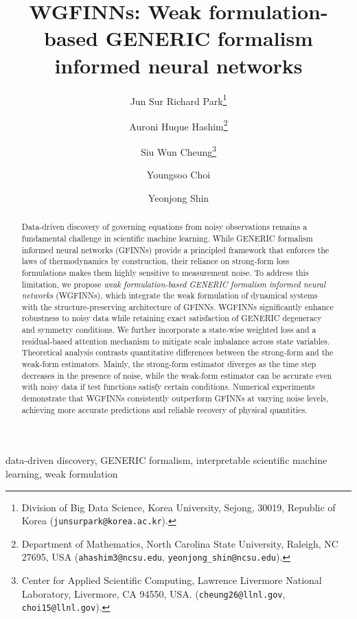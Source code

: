 \documentclass[final]{siamltex}
\title{WGFINN{s}: Weak formulation-based GENERIC formalism informed neural networks}
\author{
Jun Sur Richard Park\thanks{Division of Big Data Science, Korea University, Sejong, 30019, Republic of Korea (\texttt{junsurpark@korea.ac.kr}).}
\and
Auroni Huque Hashim\thanks{Department of Mathematics, North Carolina State University, Raleigh, NC 27695, USA (\texttt{ahashim3@ncsu.edu}, \texttt{yeonjong\_shin@ncsu.edu}).}
\and
Siu Wun Cheung\thanks{Center for Applied Scientific Computing, Lawrence Livermore National Laboratory, Livermore, CA 94550, USA. (\texttt{cheung26@llnl.gov},
\texttt{choi15@llnl.gov}).}
\and
Youngsoo Choi\footnotemark[3]%
\and
Yeonjong Shin\footnotemark[2]
}
\begin{document}
\maketitle 

\begin{abstract}
Data-driven discovery of governing equations from noisy observations remains a fundamental challenge in scientific machine learning. 
While GENERIC formalism informed neural networks (GFINNs) provide a principled framework that enforces the laws of thermodynamics by construction, their reliance on strong-form loss formulations makes them highly sensitive to measurement noise.
To address this limitation, we propose \emph{weak formulation-based GENERIC formalism informed neural networks} (WGFINNs), which integrate the weak formulation of dynamical systems with the structure-preserving architecture of GFINNs. WGFINNs significantly enhance robustness to noisy data while retaining exact satisfaction of GENERIC degeneracy and symmetry conditions.
We further incorporate a state-wise weighted loss and a residual-based attention mechanism to mitigate scale imbalance across state variables.
Theoretical analysis contrasts quantitative differences between the strong-form and the weak-form estimators. Mainly, the strong-form estimator diverges as the time step decreases in the presence of noise, while the weak-form estimator can be accurate even with noisy data if test functions satisfy certain conditions.
Numerical experiments demonstrate that WGFINNs consistently outperform GFINNs at varying noise levels, achieving more accurate predictions and reliable recovery of physical quantities.
\end{abstract}

\begin{keywords}
data-driven discovery, GENERIC formalism, interpretable scientific machine learning, weak formulation
\end{keywords}
\end{document}
